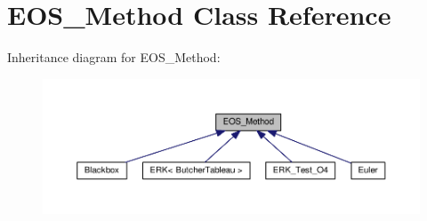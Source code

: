 \hypertarget{classEOS__Method}{}\section{E\+O\+S\+\_\+\+Method Class Reference}
\label{classEOS__Method}


Inheritance diagram for E\+O\+S\+\_\+\+Method\+:\nopagebreak
\begin{figure}[H]
\begin{center}
\leavevmode
\includegraphics[width=350pt]{classEOS__Method__inherit__graph}
\end{center}
\end{figure}
